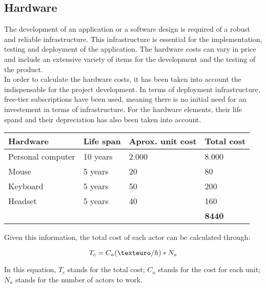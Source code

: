 \documentclass[../memory.tex]{subfiles}
\begin{document}
\subsection{Hardware}
The development of an application or a software design is required of a robust
and reliable infrastructure. This infrastructure is essential for the
implementation, testing and deployment of the application. The hardware costs
can vary in price and include an extensive variety of items for the development
and the testing of the product.
\\
In order to calculate the hardware costs, it has been taken into account the
indispensable for the project development. In terms of deployment
infrastructure, free-tier subscriptions have been used, meaning there is no
initial need for an investement in terms of infrastructure. For the hardware
elements, their life spand and their depreciation has also been taken into
account.
\\[12pt]
\begin{tabularx}{\textwidth}{|X|X|X|X|}
	\hline
	\rowcolor{rowColor}
	Hardware              & Life span              & Aprox. unit cost & Total cost     \\
	\hline
	Personal computer     & 10 years               & 2.000\texteuro   & 8.000\texteuro \\
	\hline
	Mouse                 & 5 years                & 20\texteuro      & 80\texteuro    \\
	\hline
	Keyboard              & 5 years                & 50\texteuro      & 200\texteuro   \\
	\hline
	Headset               & 5 years                & 40\texteuro      & 160\texteuro   \\
	\hline
	\multicolumn{3}{X|}{} & \textbf{8440\texteuro}                                     \\
	\cline{4-3}
\end{tabularx}
\vspace*{8pt}
Given this information, the total cost of each actor can be calculated through:
\begin{center}
	\[ T_c = C_u(\texteuro/h) * N_a \]
\end{center}
In this equation, $T_c$ stands for the total cost; $C_u$ stands for the cost for
each unit; $N_a$ stands for the number of actors to work.
\end{document}
